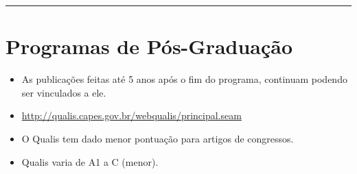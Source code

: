 \rule{\textwidth}{1pt}

\section{Programas de Pós-Graduação} 

    \begin{itemize}
        \item As publicações feitas até 5 anos após o fim do programa, continuam podendo ser vinculados a ele.
        \item \url{http://qualis.capes.gov.br/webqualis/principal.seam}
        \item O Qualis tem dado menor pontuação para artigos de congressos.
        \item Qualis varia de A1 a C (menor).
    \end{itemize}